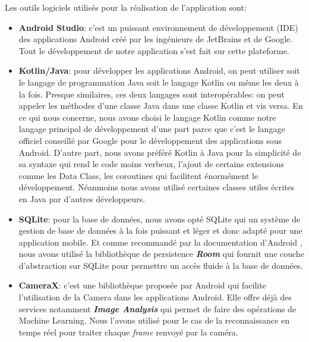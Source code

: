     Les outils logiciels utilisés pour la réalisation de l’application sont:
    \begin{itemize}
        \item \textbf{Android Studio}: c’est un puissant environnement de développement (IDE) des applications Android créé par les ingénieurs de JetBrains et de Google. Tout le développement de notre application s’est fait sur cette plateforme. 
        
        \item \textbf{Kotlin/Java}: pour développer les applications Android, on peut utiliser soit le langage de programmation Java soit le langage Kotlin ou même les deux à la fois. Presque similaires, ces deux langages sont interopérables: on peut appeler les méthodes d'une classe Java dans une classe Kotlin et vis versa. En ce qui nous concerne, nous avons choisi le langage Kotlin comme notre langage principal de développement d’une part parce que c’est le langage officiel conseillé par Google pour le développement des applications sous Android. D’autre part, nous avons préféré Kotlin à Java pour la simplicité de sa syntaxe qui rend le code moins verbeux, l’ajout de certains extensions comme les Data Class, les coroutines qui facilitent énormément le développement. Néanmoins nous avons utilisé certaines classes utiles écrites en Java par d'autres développeurs.  
        
        \item \textbf{SQLite}: pour la base de données, nous avons opté SQLite qui un système de gestion de base de données à la fois puissant et léger et donc adapté pour une application mobile. Et comme recommandé par la documentation d'Android \cite{androiddocs}, nous avons utilisé la bibliothèque de persistence \textbf{\textit{Room}} qui fournit une couche d'abstraction sur SQLite pour permettre un accès fluide à la base de données.

        \item \textbf{CameraX}: c'est une bibliothèque proposée par Android qui facilite l'utilisation de la Camera dans les applications Android. Elle offre déjà des services notamment \textbf{\textit{Image Analysis}} qui permet de faire des opérations de Machine Learning. Nous l'avons utilisé pour le cas de la reconnaissance en temps réel pour traiter chaque \textit{frame} renvoyé par la caméra.
        

\end{itemize}
